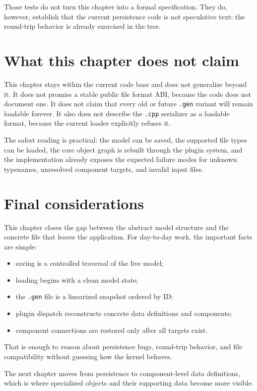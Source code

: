 Those tests do not turn this chapter into a formal specification. They do,
however, establish that the current persistence code is not speculative text:
the round-trip behavior is already exercised in the tree.

\section{What this chapter does not claim}
\label{sec:model-persistence-limits}

This chapter stays within the current code base and does not generalize beyond
it. It does not promise a stable public file format ABI, because the code does
not document one. It does not claim that every old or future \texttt{.gen}
variant will remain loadable forever. It also does not describe the \texttt{.cpp}
serializer as a loadable format, because the current loader explicitly refuses
it.

The safest reading is practical: the model can be saved, the supported file
types can be loaded, the core object graph is rebuilt through the plugin
system, and the implementation already exposes the expected failure modes for
unknown typenames, unresolved component targets, and invalid input files.

\section{Final considerations}
\label{sec:model-persistence-final-considerations}

This chapter closes the gap between the abstract model structure and the
concrete file that leaves the application. For day-to-day work, the important
facts are simple:
\begin{itemize}
\item saving is a controlled traversal of the live model;
\item loading begins with a clean model state;
\item the \texttt{.gen} file is a linearized snapshot ordered by ID;
\item plugin dispatch reconstructs concrete data definitions and components;
\item component connections are restored only after all targets exist.
\end{itemize}

That is enough to reason about persistence bugs, round-trip behavior, and file
compatibility without guessing how the kernel behaves.

The next chapter moves from persistence to component-level data definitions,
which is where specialized objects and their supporting data become more
visible.

